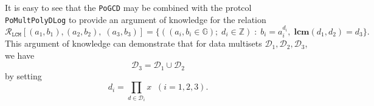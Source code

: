 \documentclass[11pt, lettersize, notitlepage, leqno, footskip=0.6cm]{article}
\newcommand{\bz}{\mathbb Z}
\newcommand{\pl}{\prod\limits}
\newcommand{\ttt}{\texttt}
\newcommand{\mc}{\mathcal}
\newcommand{\mb}{\mathbb}
\newcommand{\mbf}{\mathbf}
\newcommand{\mr}{\mathrm}
\newcommand{\mP}{\mc{P}}
\newcommand{\V}{\mc{V}}
\newcommand{\vs}{\vspace{-0.15cm}}
\newcommand{\noin}{\noindent}
\newcommand{\LCM}{\mbf{lcm}}
\numberwithin{equation}{section}
\begin{document}
It is easy to see that the \verb|PoGCD| may be combined with the protcol \verb|PoMultPolyDLog| to provide an argument of knowledge for the relation \vs $$\mc{R}_{{\ttt{LCM}}}[(a_1,b_1),(a_2,b_2), \; (a_3, b_3)] = \{((a_i, b_i\in\mb{G});\;d_i\in\bz)\;:\; b_i = a_i^{d_i},\;\LCM(d_1,d_2)=d_3 \} .$$ This argument of knowledge can demonstrate that for data multisets $\mc{D}_1,\mc{D}_2, \mc{D}_3$, we have \vs $$\mc{D}_3 = \mc{D}_1\cup \mc{D}_2 $$ by setting \vs $$ d_i = \prod\limits_{d\in\mc{D}_i} x\;\;(i=1,2,3).$$\vspace{0.2cm}


\begin{comment}

\noin \textbf{Multiplicities in multiset commitments:} As before, let $g$ be a randomly generated element in a hidden order group $\mb{G}$. Let $\mc{M}, \mc{N}$ be multiset and let \vs $$\protect{\verb|Com|}(M):= g^{\pl_{x\in \mc{M}} x^{\mr{mult(x,M)}}}\;,\;\protect{\verb|Com|}(N):= g^{\pl_{x\in \mc{N}} x^{\mr{mult(x,N)}}}$$ be the commitments to $\mc{M}$, $\mc{N}$ respectively.




For a set $\mc{D}$, a Prover can use the protocol \verb|PoGCD| to demonstrate that every element of $\mc{D}$ occurs with a higher multiplicity in $\mc{M}$ than in $\mc{N}$. This proof is public verifiable against the commitments to $\mc{M}$, $\mc{N}$ and $\mc{D}$. \vspace{0.15cm}

\noin 1. The Prover $\mP$ computes \vs $$\protect{\verb|Com|}(\mc{D}):= g^{\pl_{x\in \mc{D}} x}$$ and sends it to the Verifier $\V$ along with a \verb|PoE| for this exponentiation.

\noin 2. $\mP$ computes the multiplicities $m_x$, $n_x$ of every element $x\in\mc{D}$ in $\mc{M}$ and $\mc{N}$ respectively.

\noin 3. $\mP$ computes \vs $$a_1:= g^{{\pl_{x\in \mc{D}} x^{n_x}}}\;,\; a_2 := g^{{\pl_{x\in \mc{D}} x^{n_x+1}}} $$ and sends them to $\V$ along with a non-interactive proof for \verb|EqDLog|$[(g, \protect{\verb|Com|}(\mc{D})),\;(a_1,a_2)]$.

\noin 4. $\mP$ computes a non-interactive proof for \verb|PoGCD|$[(g, a_2),\;(g, \protect{\verb|Com|}(\mc{N})),\;(g,a_1)]$ and sends it to $\V$. 

\noin 5. $\mP$ computes a non-interactive proof for \verb|PoKE|$[a_2, \protect{\verb|Com|}(\mc{M})]$ and sends it to $\V$.

\noin 6. $\V$ verifies the three proofs and accepts if and only if they are all valid.
 

\end{comment}
\end{document}
